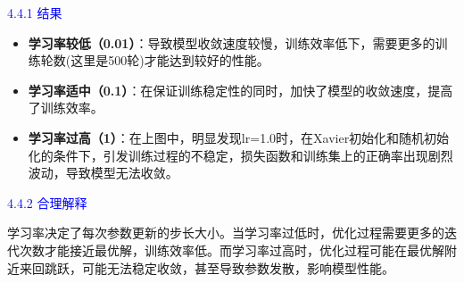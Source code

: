 \documentclass[8pt]{article}
\begin{document}
\textcolor{blue}{4.4.1 结果}
\begin{itemize}
    \item \textbf{学习率较低（0.01）}：导致模型收敛速度较慢，训练效率低下，需要更多的训练轮数(这里是500轮)才能达到较好的性能。
    \item \textbf{学习率适中（0.1）}：在保证训练稳定性的同时，加快了模型的收敛速度，提高了训练效率。
    \item \textbf{学习率过高（1）}：在上图中，明显发现lr=1.0时，在Xavier初始化和随机初始化的条件下，引发训练过程的不稳定，损失函数和训练集上的正确率出现剧烈波动，导致模型无法收敛。
\end{itemize}

\textcolor{blue}{4.4.2 合理解释}

学习率决定了每次参数更新的步长大小。当学习率过低时，优化过程需要更多的迭代次数才能接近最优解，训练效率低。而学习率过高时，优化过程可能在最优解附近来回跳跃，可能无法稳定收敛，甚至导致参数发散，影响模型性能。
\end{document}

